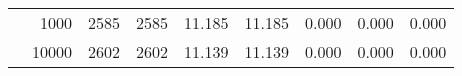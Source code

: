 \begin{table}
\begin{tabular}{rrrrrrrrr}
	            
					 &  
					 
					\multirow{ 1 }{*}{ 1000 } &
					
						
							    
							     2585  & 2585  
	                           & 11.185 & 11.185 & 0.000
	                           & 0.000 & 0.000  \\
	                
	            
					 &  
					 
					\multirow{ 1 }{*}{ 10000 } &
					
						
							    
							     2602  & 2602  
	                           & 11.139 & 11.139 & 0.000
	                           & 0.000 & 0.000  \\
	                
	            
	        

\hline

\end{tabular}
\end{table}
\clearpage


	    

